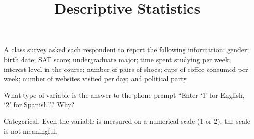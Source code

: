 \documentclass[11pt]{exam}
\title{Descriptive Statistics}
\begin{document}
\begin{questions}

  



\question A class survey asked each respondent to report the following
information: gender; birth date; SAT score; undergraduate major; time spent
studying per week; interest level in the course; number of pairs of shoes;
cups of coffee consumed per week; number of websites visited per day; and
political party.



\question What type of variable is the answer to the phone prompt
``Enter `1' for English, `2' for Spanish.''?  Why?

\begin{solution}
  Categorical.  Even the variable is measured on a numerical scale (1 or 2),
  the scale is not meaningful.
\end{solution}




\end{questions}
\end{document}
